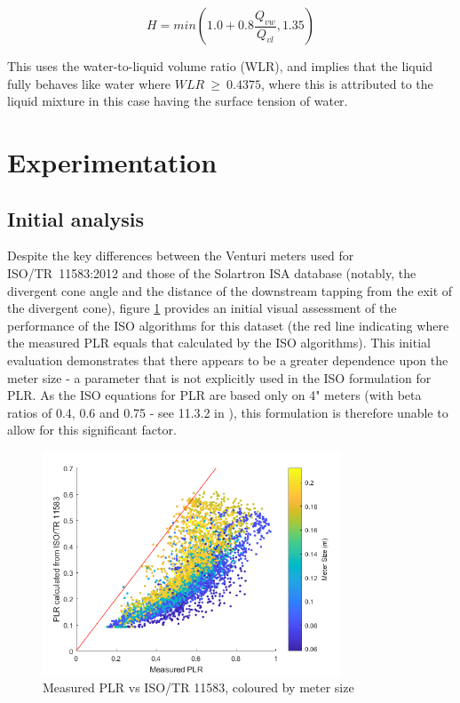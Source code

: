 \documentclass[journal]{IEEEtran}
\begin{document}
\begin{equation}
H = min \left( 1.0 + 0.8 \frac{Q_{vw}}{Q_{vl}}, 1.35 \right)    
\end{equation}

This uses the water-to-liquid volume ratio (WLR), and implies that the liquid fully behaves like water where $WLR~\geq~0.4375$, where this is attributed to the liquid mixture in this case having the surface tension of water.


\section{Experimentation}

\subsection{Initial analysis}
Despite the key differences between the Venturi meters used for ISO/TR~11583:2012 and those of the Solartron ISA database (notably, the divergent cone angle and the distance of the downstream tapping from the exit of the divergent cone), figure \ref{fig:PLR2} provides an initial visual assessment of the performance of the ISO algorithms for this dataset (the red line indicating where the measured PLR equals that calculated by the ISO algorithms). This initial evaluation demonstrates that there appears to be a greater dependence upon the meter size - a parameter that is not explicitly used in the ISO formulation for \acrshort{PLR}. As the ISO equations for PLR are based only on 4" meters (with beta ratios of 0.4, 0.6 and 0.75 - see 11.3.2 in \cite{Reader-Harris2015}), this formulation is therefore unable to allow for this significant factor.
\begin{figure}[h]
\centering
\includegraphics[width=3.5in]{PLR2.png}
\caption[]{ Measured PLR vs ISO/TR 11583, coloured by meter size }
\label{fig:PLR2}
\end{figure}
\end{document}
